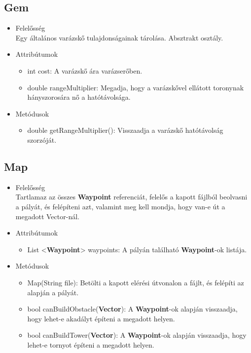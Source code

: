 \subsection{Gem}
\begin{itemize}
\item Felelősség\\
Egy általános varázskő tulajdonságainak tárolása. Absztrakt osztály.
\item Attribútumok
	\begin{itemize}
		\item int cost: A varázskő ára varázserőben.
		\item double rangeMultiplier: Megadja, hogy a varázskővel ellátott toronynak hányszorosára nő a hatótávolsága.
	\end{itemize}
\item Metódusok
	\begin{itemize}
		\item double getRangeMultiplier(): Visszaadja a varázskő hatótávolság szorzóját.
	\end{itemize}
\end{itemize}


\subsection{Map}
\begin{itemize}
\item Felelősség\\
Tartlamaz az összes \textbf{Waypoint} referenciát, felelős a kapott fájlból beolvasni a pályát, és felépíteni azt, valamint meg kell mondja, hogy van-e út a megadott Vector-nál.
\item Attribútumok
	\begin{itemize}
		\item List <\textbf{Waypoint}> waypoints: A pályán található \textbf{Waypoint}-ok listája.
	\end{itemize}
\item Metódusok
	\begin{itemize}
		\item Map(String file): Betölti a kapott elérési útvonalon a fájlt, és felépíti az alapján a pályát.
		\item bool canBuildObstacle(\textbf{Vector}): A \textbf{Waypoint}-ok alapján visszaadja, hogy lehet-e akadályt építeni a megadott helyen.
		\item bool canBuildTower(\textbf{Vector}): A \textbf{Waypoint}-ok alapján visszaadja, hogy lehet-e tornyot építeni a megadott helyen.
	\end{itemize}
\end{itemize}


